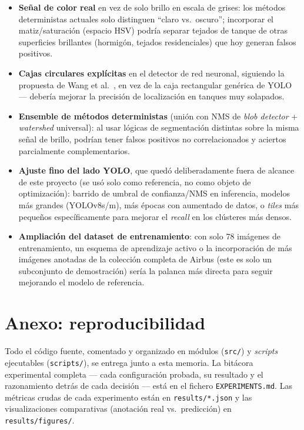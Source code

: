\documentclass[11pt,a4paper]{article}
\begin{document}
\begin{itemize}
    \item \textbf{Señal de color real} en vez de solo brillo en escala de grises:
    los métodos deterministas actuales solo distinguen ``claro vs.\ oscuro'';
    incorporar el matiz/saturación (espacio HSV) podría separar tejados de tanque
    de otras superficies brillantes (hormigón, tejados residenciales) que hoy
    generan falsos positivos.
    \item \textbf{Cajas circulares explícitas} en el detector de red neuronal,
    siguiendo la propuesta de Wang et al.\ \cite{wang2025circular}, en vez de la
    caja rectangular genérica de YOLO --- debería mejorar la precisión de
    localización en tanques muy solapados.
    \item \textbf{Ensemble de métodos deterministas} (unión con NMS de \emph{blob
    detector} + \emph{watershed} universal): al usar lógicas de segmentación
    distintas sobre la misma señal de brillo, podrían tener falsos positivos no
    correlacionados y aciertos parcialmente complementarios.
    \item \textbf{Ajuste fino del lado YOLO}, que quedó deliberadamente fuera de
    alcance de este proyecto (se usó solo como referencia, no como objeto de
    optimización): barrido de umbral de confianza/NMS en inferencia, modelos más
    grandes (YOLOv8s/m), más épocas con aumentado de datos, o \emph{tiles} más
    pequeños específicamente para mejorar el \emph{recall} en los clústeres más
    densos.
    \item \textbf{Ampliación del dataset de entrenamiento}: con solo 78 imágenes
    de entrenamiento, un esquema de aprendizaje activo o la incorporación de más
    imágenes anotadas de la colección completa de Airbus (este es solo un
    subconjunto de demostración) sería la palanca más directa para seguir
    mejorando el modelo de referencia.
\end{itemize}

\section*{Anexo: reproducibilidad}

Todo el código fuente, comentado y organizado en módulos (\texttt{src/}) y
\emph{scripts} ejecutables (\texttt{scripts/}), se entrega junto a esta memoria. La
bitácora experimental completa --- cada configuración probada, su resultado y el
razonamiento detrás de cada decisión --- está en el fichero \texttt{EXPERIMENTS.md}.
Las métricas crudas de cada experimento están en \texttt{results/*.json} y las
visualizaciones comparativas (anotación real vs.\ predicción) en
\texttt{results/figures/}.
\end{document}
